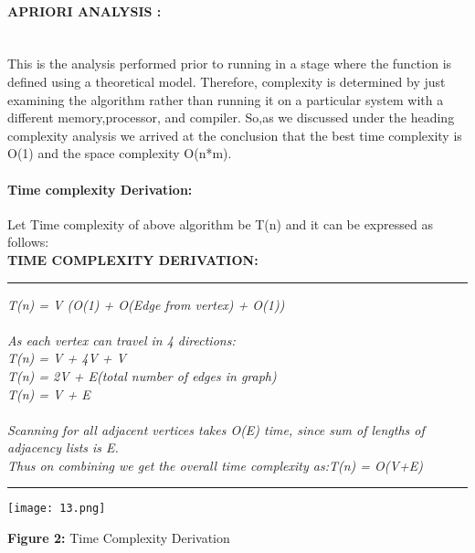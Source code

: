 \documentclass[10pt]{article}
\begin{document}
\begin{multicols*}{2}
\paragraph{APRIORI ANALYSIS :}\\
This is the analysis performed prior to running in a stage where the function is defined using a theoretical model. Therefore, complexity is determined by just examining the algorithm rather than running it on a particular system with a different memory,processor, and compiler. So,as we discussed under the heading complexity analysis we arrived at the conclusion that the best time complexity is O(1) and the space complexity O(n*m).

\paragraph{Time complexity Derivation:} Let Time complexity of above algorithm be T(n) and it can be expressed as follows:\\
\textbf{TIME COMPLEXITY DERIVATION:}
\rule{9cm}{1pt}
\textit{
T(n) = V (O(1) + O(Edge from vertex) + O(1))\\\\
As each vertex can travel in 4 directions:\\
T(n) = V + 4V  + V\\
T(n) = 2V + E(total number of edges in graph)\\
T(n) = V + E \\
\\
Scanning for all adjacent vertices takes O(E) time, since sum of lengths of adjacency lists is E.\\
Thus on combining we get the overall time 
complexity as:T(n) = O(V+E)\\}
\rule{9cm}{1pt}

\texttt{[image: 13.png]}\begin{center}\textbf{Figure 2:} Time Complexity Derivation  \end{center}
\end{multicols*}
\end{document}
